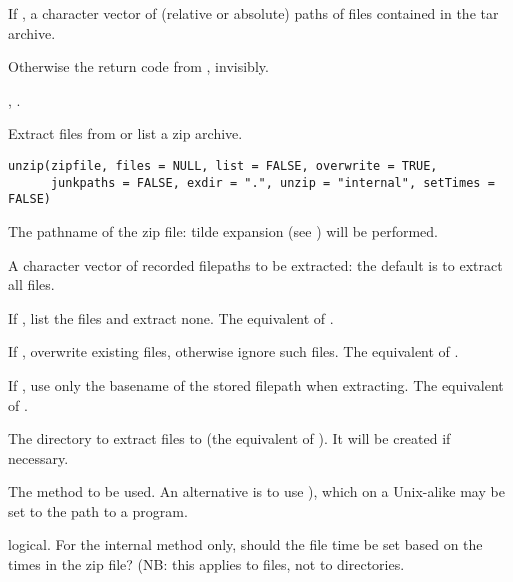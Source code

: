%
\begin{Value}
If , a character vector of (relative or absolute)
paths of files contained in the tar archive.

Otherwise the return code from , invisibly.
\end{Value}
%
\begin{SeeAlso}\relax
{}, .  
\end{SeeAlso}
%
\begin{Description}\relax
Extract files from or list a zip archive.
\end{Description}
%
\begin{Usage}
\begin{verbatim}
unzip(zipfile, files = NULL, list = FALSE, overwrite = TRUE,
      junkpaths = FALSE, exdir = ".", unzip = "internal", setTimes = FALSE)
\end{verbatim}
\end{Usage}
%
\begin{Arguments}
\begin{ldescription}
\item[\code{zipfile}] The pathname of the zip file: tilde expansion (see
) will be performed.

\item[\code{files}] A character vector of recorded filepaths to be extracted:
the default is to extract all files.

\item[\code{list}] If , list the files and extract none.  The
equivalent of .

\item[\code{overwrite}] If , overwrite existing files, otherwise
ignore such files.  The equivalent of .

\item[\code{junkpaths}] If , use only the basename of the stored
filepath when extracting.  The equivalent of .

\item[\code{exdir}] The directory to extract files to (the equivalent of
).  It will be created if necessary.

\item[\code{unzip}] The method to be used.  An alternative is to use
), which on a Unix-alike may be set to the
path to a  program.

\item[\code{setTimes}] logical.  For the internal method only, should the
file time be set based on the times in the zip file?  (NB: this
applies to files, not to directories.
\end{ldescription}
\end{Arguments}
